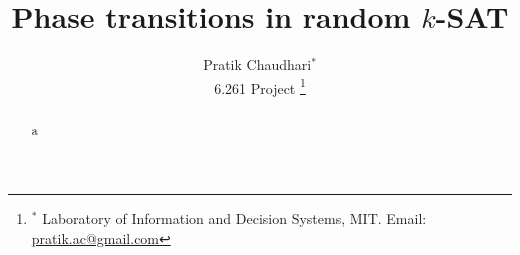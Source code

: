 \documentclass[letterpaper, 10 pt, conference]{ieeeconf}
\title{\bf Phase transitions in random $k$-SAT}
\author{Pratik Chaudhari$^*$\\[0.05in] 6.261 Project
\thanks{$^*$ Laboratory of Information and Decision Systems, MIT.
\newline Email: \href{pratik.ac@gmail.com}{pratik.ac@gmail.com}}
}
\begin{document}
\maketitle
\thispagestyle{empty}
\pagestyle{empty}

\begin{abstract}
a
\end{abstract}
\end{document}
